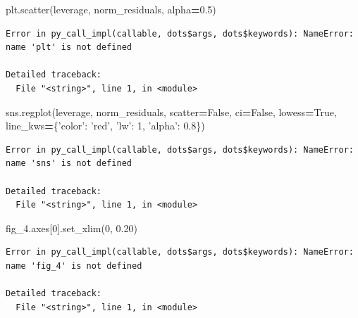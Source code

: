 \documentclass[]{book}
\newenvironment{Shaded}{\begin{snugshade}}{\end{snugshade}}
\newcommand{\DecValTok}[1]{\textcolor[rgb]{0.00,0.00,0.81}{#1}}
\newcommand{\FloatTok}[1]{\textcolor[rgb]{0.00,0.00,0.81}{#1}}
\newcommand{\NormalTok}[1]{#1}
\newcommand{\OperatorTok}[1]{\textcolor[rgb]{0.81,0.36,0.00}{\textbf{#1}}}
\newcommand{\StringTok}[1]{\textcolor[rgb]{0.31,0.60,0.02}{#1}}
\newcommand{\VariableTok}[1]{\textcolor[rgb]{0.00,0.00,0.00}{#1}}
\begin{document}
\begin{Shaded}
\begin{Highlighting}[]
\NormalTok{plt.scatter(leverage, norm_residuals, alpha}\OperatorTok{=}\FloatTok{0.5}\NormalTok{)}
\end{Highlighting}
\end{Shaded}

\begin{verbatim}
Error in py_call_impl(callable, dots$args, dots$keywords): NameError: name 'plt' is not defined

Detailed traceback: 
  File "<string>", line 1, in <module>
\end{verbatim}

\begin{Shaded}
\begin{Highlighting}[]
\NormalTok{sns.regplot(leverage, norm_residuals, }
\NormalTok{            scatter}\OperatorTok{=}\VariableTok{False}\NormalTok{, }
\NormalTok{            ci}\OperatorTok{=}\VariableTok{False}\NormalTok{, }
\NormalTok{            lowess}\OperatorTok{=}\VariableTok{True}\NormalTok{,}
\NormalTok{            line_kws}\OperatorTok{=}\NormalTok{\{}\StringTok{'color'}\NormalTok{: }\StringTok{'red'}\NormalTok{, }\StringTok{'lw'}\NormalTok{: }\DecValTok{1}\NormalTok{, }\StringTok{'alpha'}\NormalTok{: }\FloatTok{0.8}\NormalTok{\})}
\end{Highlighting}
\end{Shaded}

\begin{verbatim}
Error in py_call_impl(callable, dots$args, dots$keywords): NameError: name 'sns' is not defined

Detailed traceback: 
  File "<string>", line 1, in <module>
\end{verbatim}

\begin{Shaded}
\begin{Highlighting}[]
\NormalTok{fig_4.axes[}\DecValTok{0}\NormalTok{].set_xlim(}\DecValTok{0}\NormalTok{, }\FloatTok{0.20}\NormalTok{)}
\end{Highlighting}
\end{Shaded}

\begin{verbatim}
Error in py_call_impl(callable, dots$args, dots$keywords): NameError: name 'fig_4' is not defined

Detailed traceback: 
  File "<string>", line 1, in <module>
\end{verbatim}
\end{document}
